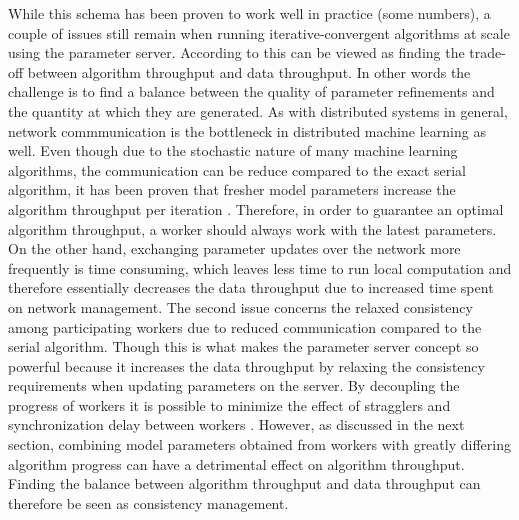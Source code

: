 While this schema has been proven to work well in practice (some numbers), a couple of issues still remain when running iterative-convergent algorithms at scale using the parameter server.
According to \cite{wei2015managed} this can be viewed as finding the trade-off between algorithm throughput and data throughput.
In other words the challenge is to find a balance between the quality of parameter refinements and the quantity at which they are generated.
As with distributed systems in general, network commmunication is the bottleneck in distributed machine learning as well.
Even though due to the stochastic nature of many machine learning algorithms, the communication can be reduce compared to the exact serial algorithm, it has been proven that fresher model parameters increase the algorithm throughput per iteration \cite{langford2009slow}.
Therefore, in order to guarantee an optimal algorithm throughput, a worker should always work with the latest parameters.
On the other hand, exchanging parameter updates over the network more frequently is time consuming, which leaves less time to run local computation and therefore essentially decreases the data throughput due to increased time spent on network management.
The second issue concerns the relaxed consistency among participating workers due to reduced communication compared to the serial algorithm.
Though this is what makes the parameter server concept so powerful because it increases the data throughput by relaxing the consistency requirements when updating parameters on the server.
By decoupling the progress of workers it is possible to minimize the effect of stragglers and synchronization delay between workers \cite{ananthanarayanan2013effective}.
However, as discussed in the next section, combining model parameters obtained from workers with greatly differing algorithm progress can have a detrimental effect on algorithm throughput.
Finding the balance between algorithm throughput and data throughput can therefore be seen as consistency management.


